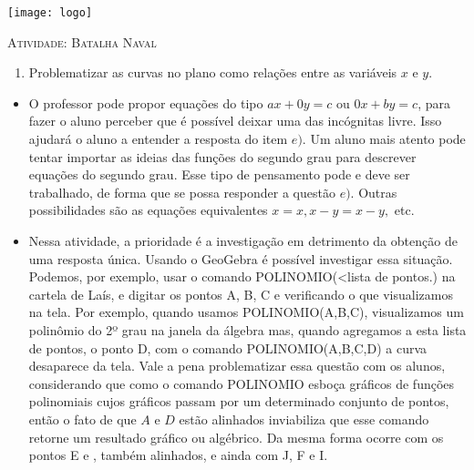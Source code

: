 \documentclass[10 pt,usenames,dvipsnames, oneside]{article}
\begin{document}
\begin{center}
  \begin{minipage}[l]{3cm}
\texttt{[image: logo]}    
\end{minipage}\hfill
\begin{minipage}[r]{.8\textwidth}
 {\Large \scshape Atividade: Batalha Naval}  
\end{minipage}
\end{center}
\vspace{.2cm}

\ifdefined\prof

\begin{goals}
\begin{enumerate}
\item Problematizar as curvas no plano como relações entre as variáveis $x$ e $y$.
\end{enumerate}

\tcblower

\begin{itemize}
\item  O professor pode propor equações do tipo $ax+0y=c$ ou $0x+by=c$, para fazer o aluno perceber que é possível deixar uma das incógnitas livre. Isso ajudará o aluno a entender a resposta do item $e)$. Um aluno mais atento pode tentar importar as ideias das funções do segundo grau para descrever equações do segundo grau. Esse tipo de pensamento pode e deve ser trabalhado, de forma que se possa responder a questão $e)$. Outras possibilidades são as equações equivalentes $x = x, x-y = x-y,$ etc.
%
\item Nessa atividade, a prioridade é a investigação em detrimento da obtenção de uma resposta única. Usando o GeoGebra é possível investigar essa situação. Podemos, por exemplo, usar o comando POLINOMIO(<lista de pontos.) na cartela de Laís, e digitar os pontos A, B, C e verificando o que visualizamos na tela. Por exemplo, quando usamos POLINOMIO(A,B,C), visualizamos um polinômio do 2º grau na janela da álgebra mas, quando agregamos a esta lista de pontos, o ponto D, com o comando POLINOMIO(A,B,C,D) a curva desaparece da tela. Vale a pena problematizar essa questão com os alunos, considerando que como o comando POLINOMIO esboça gráficos de funções polinomiais cujos gráficos passam por um determinado conjunto de pontos, então o fato de que $A$ e $D$ estão alinhados inviabiliza que esse comando retorne um resultado gráfico ou algébrico. Da mesma forma ocorre com os pontos E e , também alinhados, e ainda com J, F e I.


\end{itemize}
\end{goals}
\end{document}
